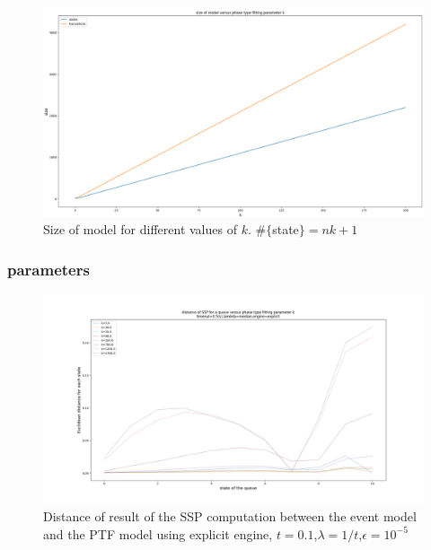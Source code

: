 \documentclass[paper=a4, fontsize=11pt]{scrartcl}
\numberwithin{equation}{section}		%
\numberwithin{figure}{section}			%
\numberwithin{table}{section}				%
\begin{document}
	\begin{figure}
		\centering
		\includegraphics[width=16cm]{picture/size.png}
		\caption{Size of model for different values of $k$. $\#\{$state$\} = nk+1$}
		\label{fig:time1}
	\end{figure}

	
	\subsubsection{parameters}

	
	\begin{figure}
		\centering
		\includegraphics[width=18cm]{picture/distance_explicit.png}
		\caption{Distance of result of the SSP computation between the event model and the PTF model using explicit engine,	$t=0.1$,$\lambda=1/t$,$\epsilon=10^{-5}$}
		\label{fig:diff_explicit_001}
	\end{figure}
	
\end{document}

